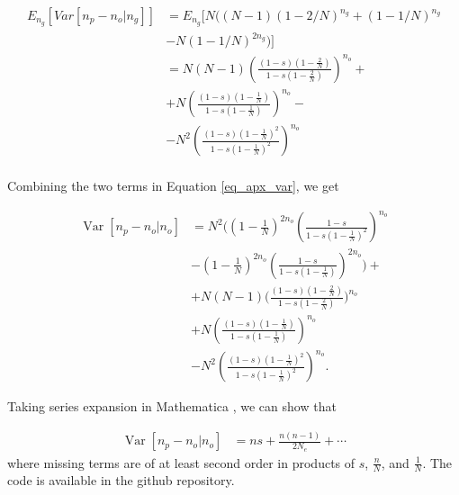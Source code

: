 \documentclass[9pt,twocolumn,twoside,lineno]{gsajnl}
\newcommand{\Var}{\operatorname{Var}}
\begin{document}
\begin{equation}
\begin{split}
	E_{n_g}\left[Var\left[n_p-n_o | n_g \right]\right] 
	&= E_{n_g}\Big[N ((N - 1) (1 - 2/N)^{n_g} + (1 - 1/N)^{n_g} \\
	&- N (1 - 1/N)^{2 n_g}) \Big] \\
	&= N (N-1) \left( \frac{ (1-s)\left( 1-\frac{2}{N} \right) }{ 1-s\left( 1-\frac{2}{N} \right) } \right)^{n_o} + \\
	&+ N \left( \frac{(1-s)\left( 1-\frac{1}{N} \right)}{1-s\left( 1-\frac{1}{N} \right)}\right)^{n_o} - \\
	&- N^2 \left( \frac{(1-s)\left( 1-\frac{1}{N} \right)^2}{1-s\left( 1-\frac{1}{N} \right)^2}\right)^{n_o} \\
\end{split}
\end{equation}

Combining the two terms in Equation \eqref{eq_apx_var}, we get

\newcommand{\vara}[1]{\left(1-\frac{#1}{N}\right)}
\newcommand{\varb}[1]{\left(\frac{1-s}{1-s #1}\right)}

\begin{equation}
  \begin{aligned}
	  \Var[n_p-n_o | n_o] &= N^2\Bigg( \vara{1}^{2n_o}\varb{\vara{1}^2}^{n_o} \\ 
	  &-\vara{1}^{2n_o}\varb{\vara{1}}^{2n_o} \Bigg) + \\
	  &+ N (N-1) \Bigg( \frac{ (1-s)\left( 1-\frac{2}{N} \right) }{ 1-s\left( 1-\frac{2}{N}
	  \right) } \Bigg)^{n_o} \\
	  &+ N \left( \frac{(1-s)\left( 1-\frac{1}{N} \right)}{1-s\left( 1-\frac{1}{N} \right)}\right)^{n_o} \\ 
	  &- N^2 \left( \frac{(1-s)\left( 1-\frac{1}{N} \right)^2}{1-s\left( 1-\frac{1}{N} \right)^2}\right)^{n_o}.
  \label{eq_exact_var}
  \end{aligned}
\end{equation}

Taking series expansion in Mathematica \citep{Mathematica}, we can show that

\begin{equation}
  \begin{aligned}
    \operatorname{Var}[n_p-n_o | n_o] &= n s + \frac{n (n-1)}{2 N_e}  + \cdots
  \end{aligned}
\end{equation}
where missing terms are of at least second order in products of  $s$, $\frac{n}{N}$,  and
$\frac{1}{N}.$ The code is available in the github repository.
\end{document}
